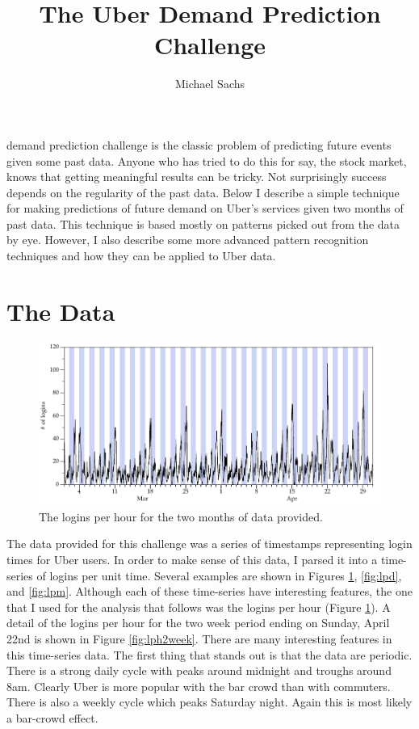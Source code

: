 \documentclass{tufte-handout}
\title{The Uber Demand Prediction Challenge}
\author[Michael Sachs]{Michael Sachs}
\date{}  %
\begin{document}
\maketitle

 demand prediction challenge is the classic problem of predicting future events given some past data. Anyone who has tried to do this for say, the stock market, knows that getting meaningful results can be tricky. Not surprisingly success depends on the regularity of the past data. Below I describe a simple technique for making predictions of future demand on Uber's services given two months of past data. This technique is based mostly on patterns picked out from the data by eye. However, I also describe some more advanced pattern recognition techniques and how they can be applied to Uber data. 



\section{The Data}

\begin{figure}[h]
    \includegraphics[width=\linewidth]{logins_per_hour.pdf}%
	\caption{The logins per hour for the two months of data provided.}%
	\label{fig:lph}%
\end{figure}

The data provided for this challenge was a series of timestamps representing login times for Uber users. In order to make sense of this data, I parsed it into a time-series of logins per unit time. Several examples are shown in Figures \ref{fig:lph}, \ref{fig:lpd}, and \ref{fig:lpm}. Although each of these time-series have interesting features, the one that I used for the analysis that follows was the logins per hour (Figure \ref{fig:lph}). A detail of the logins per hour for the two week period ending on Sunday, April 22nd is shown in Figure \ref{fig:lph2week}. There are many interesting features in this time-series data. The first thing that stands out is that the data are periodic. There is a strong daily cycle with peaks around midnight and troughs around 8am. Clearly Uber is more popular with the bar crowd than with commuters. There is also a weekly cycle which peaks Saturday night. Again this is most likely a bar-crowd effect. 
\end{document}
